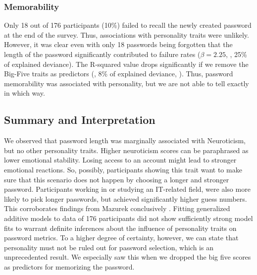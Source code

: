 \subsubsection{Memorability}
Only 18 out of 176 participants (10\%) failed to recall the newly created password at the end of the survey. Thus, associations with personality traits were unlikely. However, it was clear even with only 18 passwords being forgotten that the length of the password significantly contributed to failure rates ($\beta=2.25$, , 25\% of explained deviance). The R-squared value drops significantly if we remove the Big-Five traits as predictors (, 8\% of explained deviance, ). Thus, password memorability was associated with personality, but we are not able to tell exactly in which way. 


\subsection{Summary and Interpretation}
We observed that password length was marginally associated with Neuroticism, but no other personality traits. Higher neuroticism scores can be paraphrased as lower emotional stability. Losing access to an account might lead to stronger emotional reactions. So, possibly, participants showing this trait want to make sure that this scenario does not happen by choosing a longer and stronger password. Participants working in or studying an IT-related field, were also more likely to pick longer passwords, but achieved significantly higher guess numbers. This corroborates findings from Mazurek \etal conclusively \cite{Mazurek2013Measuring}. Fitting generalized additive models to data of 176 participants did not show sufficiently strong model fits to warrant definite inferences about the influence of personality traits on password metrics. To a higher degree of certainty, however, we can state that personality must not be ruled out for password selection, which is an unprecedented result. We especially saw this when we dropped the big five scores as predictors for memorizing the password. 

